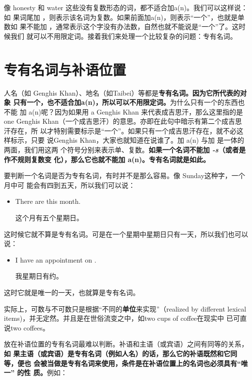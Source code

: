 像 honesty 和 water 这些没有复数形态的词，都不适合加a(n)。我们可以这样说：如
果词尾加 ，则表示该名词为复数。如果前面加a(n)，则表示“一个”，也就是单数如
果不能加 ，通常表示这个字没有办法数，自然也就不能说是“一个”了。这时候我们
就可以不用限定词。接着我们来处理一个比较复杂的问题：专有名词。

\section{专有名词与补语位置}

人名（如 Genghis Khan）、地名（如Taibei）等都是\textbf{专有名词。因为它所代表的对象
  只有一个，也不适合加a(n)，所以可以不用限定词。}为什么只有一个的东西也不能
加 a(n)呢？因为如果用 a Genghis Khan 来代表成吉思汗，那么这里指的是 one
Genghis Khan（一个成吉思汗）的意思。亦即在此句中暗示有第二个成吉思汗存在，所
以才特别需要标示是“一个”。如果只有一个成吉思汗存在，就不必这样标示，只要
说Genghis Khan，大家也就知道在说谁了。加 a(n) 与加 是一体的两面，我们用这两
个符号分别来表示单、复数。\textbf{如果一个名词不能加 \emph{-s}（或者是作不规则复数变
  化），那么它也就不能加 a(n)。专有名词就是如此。}

要判断一个名词是否为专有名词，有时并不是那么容易。像 Sunday这种字，一个月中可
能会有四到五天，所以我们可以说：
\begin{itemize}
\item There are  this month.

  这个月有五个星期日。
\end{itemize}

这时候它就不算是专有名词。可是在一个星期中星期日只有一天，所以我们也可以说：
\begin{itemize}
\item I have an appointment on .

  我星期日有约。
\end{itemize}

这时它就是唯一的一天，也就算是专有名词。

实际上，可数与不可数只是根据“不同的\textbf{单位}来实现”（realized by different
lexical items)，并无定然。并且是在世俗流变之中，如two cups of coffee在现实中
已可直说two coffees。




放在补语位置的专有名词最难以判断。补语和主语（或宾语）之间有同等的关系，\textbf{如
  果主语（或宾语）是专有名词（例如人名）的话，那么它的补语既然和它同等，便也
  会被当做是专有名词来使用，条件是在补语位置上的名词也必须具有“唯一” 的性
  质。}例如：


